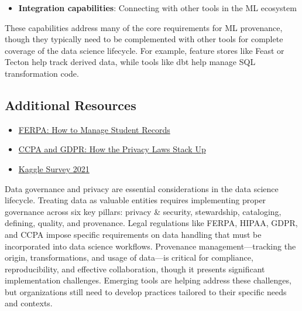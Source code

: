 \documentclass[12pt]{article}
\begin{document}
\begin{enumerate}
\begin{tcolorbox}[colback=blue!5!white,colframe=blue!75!black,title={Solution}]
\begin{itemize}
        \item \textbf{Integration capabilities}: Connecting with other tools in the ML ecosystem
    \end{itemize}
    
    These capabilities address many of the core requirements for ML provenance, though they typically need to be complemented with other tools for complete coverage of the data science lifecycle. For example, feature stores like Feast or Tecton help track derived data, while tools like dbt help manage SQL transformation code.
    \end{tcolorbox}
\end{enumerate}

\subsection{Additional Resources}

\begin{itemize}
    \item \href{https://www.recordnations.com/2019/07/ferpa-how-to-manage-student-records}{FERPA: How to Manage Student Records}
    \item \href{https://riskonnect.com/uk/regulatory-compliance/ccpa-and-gdpr-how-the-privacy-laws-stack-up/}{CCPA and GDPR: How the Privacy Laws Stack Up}
    \item \href{https://www.kaggle.com/kaggle-survey-2021}{Kaggle Survey 2021}
\end{itemize}

\begin{tcolorbox}[colback=red!5!white,colframe=red!75!black,title={Key Takeaway}]
Data governance and privacy are essential considerations in the data science lifecycle. Treating data as valuable entities requires implementing proper governance across six key pillars: privacy \& security, stewardship, cataloging, defining, quality, and provenance. Legal regulations like FERPA, HIPAA, GDPR, and CCPA impose specific requirements on data handling that must be incorporated into data science workflows. Provenance management—tracking the origin, transformations, and usage of data—is critical for compliance, reproducibility, and effective collaboration, though it presents significant implementation challenges. Emerging tools are helping address these challenges, but organizations still need to develop practices tailored to their specific needs and contexts.
\end{tcolorbox}

\newpage
\end{document}
